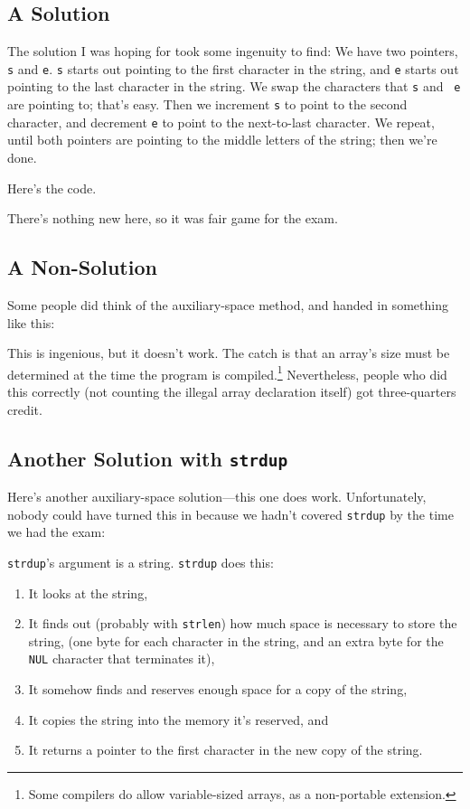 \subsection{A Solution}

The solution I was hoping for took some ingenuity to find: We have two
pointers, {\tt s} and {\tt e}. {\tt s} starts out pointing to the first
character in the string, and {\tt e} starts out pointing to the last
character in the string.  We swap the characters that {\tt s} and {\tt
e} are pointing to; that's easy.  Then we increment {\tt s} to point to
the second character, and decrement {\tt e} to point to the next-to-last
character.  We repeat, until both pointers are pointing to the middle
letters of the string; then we're done.

Here's the code.



There's nothing new here, so it was fair game for the exam.

\subsection{A Non-Solution}

Some people did think of the auxiliary-space method, and handed in
something like this:



This is ingenious, but it doesn't work.  The catch is that an array's
size must be determined at the time the program is
compiled.\footnote{Some compilers do allow variable-sized arrays, as a
non-portable extension.} Nevertheless, people who did this correctly
(not counting the illegal array declaration itself) got three-quarters
credit.

\subsection{Another Solution with {\tt strdup}}

Here's another auxiliary-space solution---this one does work.
Unfortunately, nobody could have turned this in because we hadn't
covered {\tt strdup} by the time we had the exam:



{\tt strdup}'s argument is a string.  {\tt strdup} does this:

\begin{enumerate}
\item It looks at the string,
\item It finds out (probably with {\tt strlen}) how much space is
necessary to store the string, 
(one byte for each character in the string, and an extra byte for the
{\tt NUL} character that terminates it),
\item It  somehow finds and reserves
enough space for a copy of the string,
\item It copies the string into the memory it's reserved, and
\item It returns a pointer to the first character in the new copy of the
string.
\end{enumerate}

